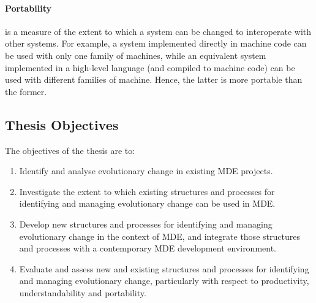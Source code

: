 
\paragraph{Portability} is a measure of the extent to which a system can be changed to interoperate with other systems. For example, a system implemented directly in machine code can be used with only one family of machines, while an equivalent system implemented in a high-level language (and compiled to machine code) can be used with different families of machine. Hence, the latter is more portable than the former.


\subsection{Thesis Objectives}
The objectives of the thesis are to:

\begin{enumerate}
	\item Identify and analyse evolutionary change in existing MDE projects.
	\item Investigate the extent to which existing structures and processes for identifying and managing evolutionary change can be used in MDE. 
	\item Develop new structures and processes for identifying and managing evolutionary change in the context of MDE, and integrate those structures and processes with a contemporary MDE development environment.
	\item Evaluate and assess new and existing structures and processes for identifying and managing evolutionary change, particularly with respect to productivity, understandability and portability.
\end{enumerate}